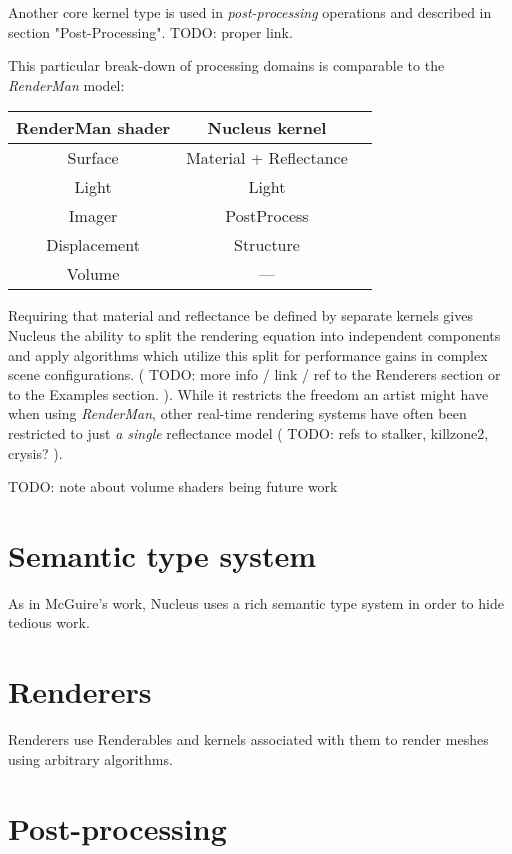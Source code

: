 Another core kernel type is used in \emph{post-processing} operations and described in section "Post-Processing". TODO: proper link.

This particular break-down of processing domains is comparable to the \emph{RenderMan} model:

\begin{center}
\begin{tabular}{ | c | c | c | }
\hline
RenderMan shader & Nucleus kernel \\
\hline
Surface & Material + Reflectance \\
Light & Light \\
Imager & PostProcess \\
Displacement & Structure \\
Volume & --- \\
\hline
\end{tabular}
\end{center}


Requiring that material and reflectance be defined by separate kernels gives Nucleus the ability to split the rendering equation into independent components and apply algorithms which utilize this split for performance gains in complex scene configurations. ( TODO: more info / link / ref to the Renderers section or to the Examples section. ). While it restricts the freedom an artist might have when using \emph{RenderMan}, other real-time rendering systems have often been restricted to just \emph{a single} reflectance model ( TODO: refs to stalker, killzone2, crysis? ).

TODO: note about volume shaders being future work

\section{Semantic type system}

As in McGuire's work, Nucleus uses a rich semantic type system in order to hide tedious work.

\section{Renderers}

Renderers use Renderables and kernels associated with them to render meshes using arbitrary algorithms.

\section{Post-processing}


